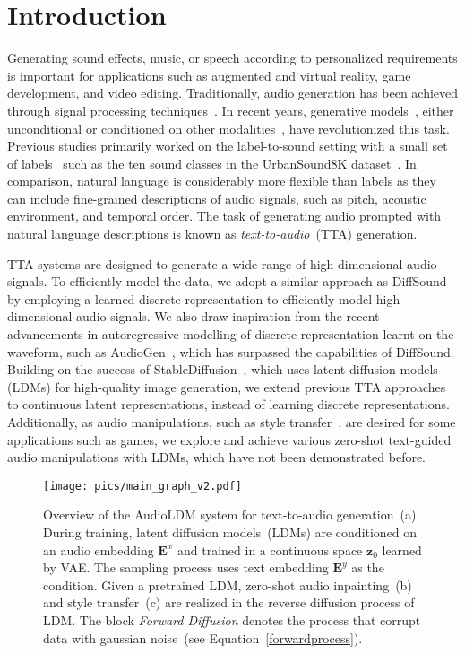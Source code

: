 \section{Introduction}
\label{Introduction}

Generating sound effects, music, or speech according to personalized requirements is important for applications such as augmented and virtual reality, game development, and video editing. Traditionally, audio generation has been achieved through signal processing techniques~\cite{andresen1979new, karplus1983digital}. In recent years, generative models~\cite{oord2016wavenet, DDPM, SGM, tan2022naturalspeech}, either unconditional or conditioned on other modalities~\cite{kreuk2022audiogen, zelaszczyk2022audio}, have revolutionized this task. Previous studies primarily worked on the label-to-sound setting with a small set of labels~\cite{liu2021conditional,pascual2022full} such as the ten sound classes in the UrbanSound8K dataset~\cite{salamon2014dataset}.
In comparison, natural language is considerably more flexible than labels as they can include fine-grained descriptions of audio signals, such as pitch, acoustic environment, and temporal order. 
The task of generating audio prompted with natural language descriptions is known as \textit{text-to-audio}~(TTA) generation.

TTA systems are designed to generate a wide range of high-dimensional audio signals. To efficiently model the data, we adopt a similar approach as DiffSound~\cite{yang2022diffsound} by employing a learned discrete representation to efficiently model high-dimensional audio signals. We also draw inspiration from the recent advancements in autoregressive modelling of discrete representation learnt on the waveform, such as AudioGen~\cite{kreuk2022audiogen}, which has surpassed the capabilities of DiffSound. Building on the success of StableDiffusion~\cite{rombach2022high}, which uses latent diffusion models (LDMs) for high-quality image generation, we extend previous TTA approaches to continuous latent representations, instead of learning discrete representations. Additionally, as audio manipulations, such as style transfer~\cite{engel2020ddsp, pascual2022full}, are desired for some applications such as games, 
we explore and achieve various zero-shot text-guided audio manipulations with LDMs, which have not been demonstrated before.

\begin{figure*}
    \centerline{
    \texttt{[image: pics/main\_graph\_v2.pdf]}}
    \caption{Overview of the AudioLDM system for text-to-audio generation~(a). During training, latent diffusion models~(LDMs) are conditioned on an audio embedding $\boldsymbol{E}^{x}$ and trained in a continuous space $\boldsymbol{z}_{0}$ learned by VAE. The sampling process uses text embedding $\boldsymbol{E}^{y}$ as the condition. Given a pretrained LDM, zero-shot audio inpainting~(b) and style transfer~(c) are realized in the reverse diffusion process of LDM. The block \textit{Forward Diffusion} denotes the process that corrupt data with gaussian noise~(see Equation~\ref{forwardprocess}).}
    \label{fig:overalldesign}
\end{figure*}


